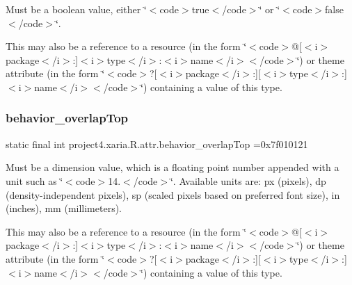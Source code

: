 Must be a boolean value, either \char`\"{}$<$code$>$true$<$/code$>$\char`\"{} or \char`\"{}$<$code$>$false$<$/code$>$\char`\"{}. 

This may also be a reference to a resource (in the form \char`\"{}$<$code$>$@\mbox{[}$<$i$>$package$<$/i$>$\+:\mbox{]}$<$i$>$type$<$/i$>$\+:$<$i$>$name$<$/i$>$$<$/code$>$\char`\"{}) or theme attribute (in the form \char`\"{}$<$code$>$?\mbox{[}$<$i$>$package$<$/i$>$\+:\mbox{]}\mbox{[}$<$i$>$type$<$/i$>$\+:\mbox{]}$<$i$>$name$<$/i$>$$<$/code$>$\char`\"{}) containing a value of this type. \mbox{\label{classproject4_1_1xaria_1_1R_1_1attr_aed17641ca0c9bd7043daece4ff69fec6}} 
\subsubsection{\texorpdfstring{behavior\+\_\+overlap\+Top}{behavior\_overlapTop}}
{\footnotesize\ttfamily static final int project4.\+xaria.\+R.\+attr.\+behavior\+\_\+overlap\+Top =0x7f010121\hspace{0.3cm}{\ttfamily [static]}}

Must be a dimension value, which is a floating point number appended with a unit such as \char`\"{}$<$code$>$14.\+5sp$<$/code$>$\char`\"{}. Available units are\+: px (pixels), dp (density-\/independent pixels), sp (scaled pixels based on preferred font size), in (inches), mm (millimeters). 

This may also be a reference to a resource (in the form \char`\"{}$<$code$>$@\mbox{[}$<$i$>$package$<$/i$>$\+:\mbox{]}$<$i$>$type$<$/i$>$\+:$<$i$>$name$<$/i$>$$<$/code$>$\char`\"{}) or theme attribute (in the form \char`\"{}$<$code$>$?\mbox{[}$<$i$>$package$<$/i$>$\+:\mbox{]}\mbox{[}$<$i$>$type$<$/i$>$\+:\mbox{]}$<$i$>$name$<$/i$>$$<$/code$>$\char`\"{}) containing a value of this type. \mbox{\label{classproject4_1_1xaria_1_1R_1_1attr_adc8d3fb6f24ec356316051d935327807}} 

